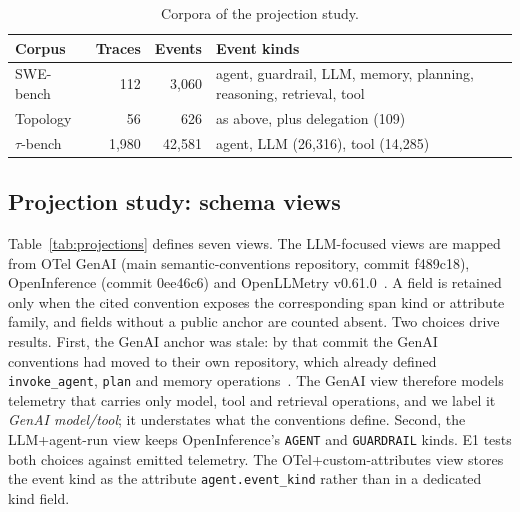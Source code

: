\documentclass[conference]{IEEEtran}
\begin{document}
\begin{table}[t]
\centering
\scriptsize
\caption{Corpora of the projection study.}
\label{tab:corpora}
\begin{tabular}{@{}p{}rrp{}@{}}
\toprule
Corpus & Traces & Events & Event kinds \\
\midrule
SWE-bench & 112 & 3,060 & agent, guardrail, LLM, memory, planning, reasoning, retrieval, tool \\
Topology & 56 & 626 & as above, plus delegation (109) \\
$\tau$-bench & 1,980 & 42,581 & agent, LLM (26,316), tool (14,285) \\
\bottomrule
\end{tabular}
\end{table}

\subsection{Projection study: schema views}

Table~\ref{tab:projections} defines seven views. The LLM-focused views
are mapped from OTel GenAI (main semantic-conventions repository,
commit f489c18), OpenInference (commit 0ee46c6) and OpenLLMetry
v0.61.0~\cite{otel_genai,openinference,openllmetry}. A field is retained
only when the cited convention exposes the corresponding span kind or
attribute family, and fields without a public anchor are counted absent.
Two choices drive results. First, the GenAI anchor was stale: by that
commit the GenAI conventions had moved to their own repository, which
already defined \texttt{invoke\_agent}, \texttt{plan} and memory
operations~\cite{otel_genai_repo}. The GenAI view therefore models
telemetry that carries only model, tool and retrieval operations, and we
label it \emph{GenAI model/tool}; it understates what the conventions
define. Second, the LLM+agent-run view keeps OpenInference's
\texttt{AGENT} and \texttt{GUARDRAIL} kinds. E1 tests both choices
against emitted telemetry. The
OTel+custom-attributes view stores the event kind as the attribute
\texttt{agent.event\_kind} rather than in a dedicated kind field.
\end{document}

